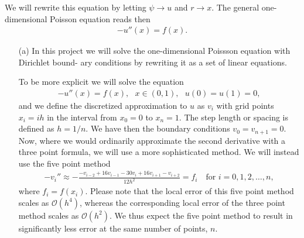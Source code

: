 \documentclass[11pt,a4wide]{article}
\begin{document}
We will rewrite this equation by letting $\psi \rightarrow u$ and $r\rightarrow x$. The general one-dimensional Poisson equation reads then
\begin{align}
-u''(x) = f(x).
\end{align}

\begin{itemize}
  \item[(a)] In this project we will solve the one-dimensional Poissson equation with Dirichlet bound-
ary conditions by rewriting it as a set of linear equations.

To be more explicit we will solve the equation
\begin{align}
-u''(x) = f(x), \ \ \ x\in(0,1), \ \ \ u(0)=u(1)=0,
\end{align}
and we define the discretized approximation to $u$ as $v_i$ with grid points $x_i = ih$ in the interval from $x_0 = 0$ to $x_n = 1$. The step length or spacing is defined as $h = 1/n$. We have then the boundary conditions $v_0 = v_{n+1} = 0$. Now, where we would ordinarily approximate the second derivative with a three point formula, we will use a more sophisticated method. We will instead use the five point method
\begin{align}
-v_i'' \approx -\frac{-v_{i-2}+16v_{i-1}-30v_i+16v_{i+1}-v_{i+2}}{12h^2} = f_i \ \ \ \text{ for } i=0,1,2,\dots,n, \label{eq:1}
\end{align}
where $f_i=f(x_i)$. Please note that the local error of this five point method scales as $\mathcal{O}(h^4)$, whereas the corresponding local error of the three point method scales as $\mathcal{O}(h^2)$. We thus expect the five point method to result in significantly less error at the same number of points, $n$.


\end{itemize}
\end{document}
